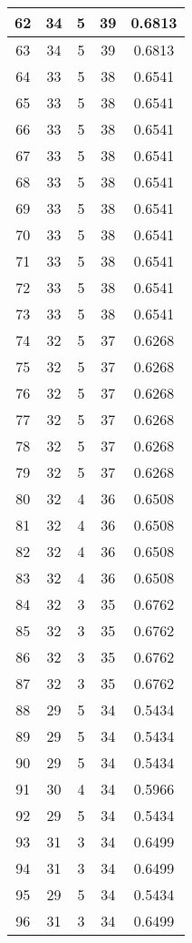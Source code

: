 \documentclass[letterpaper, 12pt]{article}
\begin{document}
\begin{longtable}{|c|c|c|c|c|}
\hline
62 & 34 & 5 & 39 & 0.6813 \\
\hline
63 & 34 & 5 & 39 & 0.6813 \\
\hline
64 & 33 & 5 & 38 & 0.6541 \\
\hline
65 & 33 & 5 & 38 & 0.6541 \\
\hline
66 & 33 & 5 & 38 & 0.6541 \\
\hline
67 & 33 & 5 & 38 & 0.6541 \\
\hline
68 & 33 & 5 & 38 & 0.6541 \\
\hline
69 & 33 & 5 & 38 & 0.6541 \\
\hline
70 & 33 & 5 & 38 & 0.6541 \\
\hline
71 & 33 & 5 & 38 & 0.6541 \\
\hline
72 & 33 & 5 & 38 & 0.6541 \\
\hline
73 & 33 & 5 & 38 & 0.6541 \\
\hline
74 & 32 & 5 & 37 & 0.6268 \\
\hline
75 & 32 & 5 & 37 & 0.6268 \\
\hline
76 & 32 & 5 & 37 & 0.6268 \\
\hline
77 & 32 & 5 & 37 & 0.6268 \\
\hline
78 & 32 & 5 & 37 & 0.6268 \\
\hline
79 & 32 & 5 & 37 & 0.6268 \\
\hline
80 & 32 & 4 & 36 & 0.6508 \\
\hline
81 & 32 & 4 & 36 & 0.6508 \\
\hline
82 & 32 & 4 & 36 & 0.6508 \\
\hline
83 & 32 & 4 & 36 & 0.6508 \\
\hline
84 & 32 & 3 & 35 & 0.6762 \\
\hline
85 & 32 & 3 & 35 & 0.6762 \\
\hline
86 & 32 & 3 & 35 & 0.6762 \\
\hline
87 & 32 & 3 & 35 & 0.6762 \\
\hline
88 & 29 & 5 & 34 & 0.5434 \\
\hline
89 & 29 & 5 & 34 & 0.5434 \\
\hline
90 & 29 & 5 & 34 & 0.5434 \\
\hline
91 & 30 & 4 & 34 & 0.5966 \\
\hline
92 & 29 & 5 & 34 & 0.5434 \\
\hline
93 & 31 & 3 & 34 & 0.6499 \\
\hline
94 & 31 & 3 & 34 & 0.6499 \\
\hline
95 & 29 & 5 & 34 & 0.5434 \\
\hline
96 & 31 & 3 & 34 & 0.6499 \\

\end{longtable}
\end{document}

